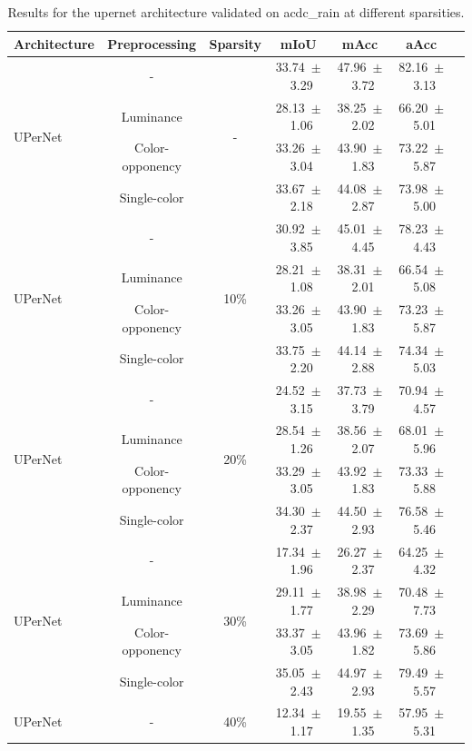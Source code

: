 \begin{table}[h]
\centering
\caption{Results for the upernet architecture validated on acdc_rain at different sparsities.}
\begin{tabular}{@{}lccc ccc@{}}
\toprule
Architecture & Preprocessing & Sparsity & mIoU & mAcc & aAcc \\
\midrule

\multirow{4}{*}{UPerNet} & - & \multirow{4}{*}{-} & 33.74~$\pm$~3.29 & 47.96~$\pm$~3.72 & 82.16~$\pm$~3.13 \\
& Luminance & & 28.13~$\pm$~1.06 & 38.25~$\pm$~2.02 & 66.20~$\pm$~5.01 \\
& Color-opponency & & 33.26~$\pm$~3.04 & 43.90~$\pm$~1.83 & 73.22~$\pm$~5.87 \\
& Single-color & & 33.67~$\pm$~2.18 & 44.08~$\pm$~2.87 & 73.98~$\pm$~5.00 \\
\midrule
\multirow{4}{*}{UPerNet} & - & \multirow{4}{*}{10\%} & 30.92~$\pm$~3.85 & 45.01~$\pm$~4.45 & 78.23~$\pm$~4.43 \\
& Luminance & & 28.21~$\pm$~1.08 & 38.31~$\pm$~2.01 & 66.54~$\pm$~5.08 \\
& Color-opponency & & 33.26~$\pm$~3.05 & 43.90~$\pm$~1.83 & 73.23~$\pm$~5.87 \\
& Single-color & & 33.75~$\pm$~2.20 & 44.14~$\pm$~2.88 & 74.34~$\pm$~5.03 \\
\midrule
\multirow{4}{*}{UPerNet} & - & \multirow{4}{*}{20\%} & 24.52~$\pm$~3.15 & 37.73~$\pm$~3.79 & 70.94~$\pm$~4.57 \\
& Luminance & & 28.54~$\pm$~1.26 & 38.56~$\pm$~2.07 & 68.01~$\pm$~5.96 \\
& Color-opponency & & 33.29~$\pm$~3.05 & 43.92~$\pm$~1.83 & 73.33~$\pm$~5.88 \\
& Single-color & & 34.30~$\pm$~2.37 & 44.50~$\pm$~2.93 & 76.58~$\pm$~5.46 \\
\midrule
\multirow{4}{*}{UPerNet} & - & \multirow{4}{*}{30\%} & 17.34~$\pm$~1.96 & 26.27~$\pm$~2.37 & 64.25~$\pm$~4.32 \\
& Luminance & & 29.11~$\pm$~1.77 & 38.98~$\pm$~2.29 & 70.48~$\pm$~7.73 \\
& Color-opponency & & 33.37~$\pm$~3.05 & 43.96~$\pm$~1.82 & 73.69~$\pm$~5.86 \\
& Single-color & & 35.05~$\pm$~2.43 & 44.97~$\pm$~2.93 & 79.49~$\pm$~5.57 \\
\midrule
\multirow{4}{*}{UPerNet} & - & \multirow{4}{*}{40\%} & 12.34~$\pm$~1.17 & 19.55~$\pm$~1.35 & 57.95~$\pm$~5.31 \\

\end{tabular}
\end{table}
